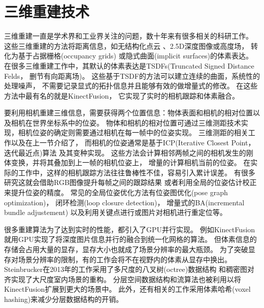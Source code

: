 \section{三维重建技术}\label{reconstruction}
三维重建一直是学术界和工业界关注的问题，数十年来有很多相关的科研工作。
这些三维重建的方法将距离信息，如无结构化点云\cite{henry2010rgb}\cite{keller2013real}
\cite{whelan2015elasticfusion}、2.5D深度图像\cite{meilland2013unifying}或高度场\cite{gallup20103d}，
转化为基于占据栅格(occupancy grids)\cite{elfes1987sensor}
或隐式曲面(implicit surfaces)的体素表达\cite{curless1996volumetric}。
在很多三维重建工作中，其默认的体素表达是TSDFs(Truncated Signed Distance Felds，
删节有向距离场)\cite{fioraio2015large}\cite{fuhrmann2014floating}。
这些基于TSDF的方法可以建立连续的曲面，系统性的处理噪声，
不需要记录显式的拓扑信息并且能够有效的做增量式的修改。
在这些方法中最有名的就是KinectFusion\cite{izadi2011kinectfusion}\cite{newcombe2011kinectfusion}，
它实现了实时的相机跟踪和体素融合。

要利用相机重建三维信息，需要获得两个位置信息：物体表面和相机的相对位置以及相机在世界坐标系中的位姿。
物体和相机的相对位置可通过三维测距技术实现，相机位姿的确定则需要通过相机在每一帧中的位姿实现。
三维测距的相关工作以及在上一节介绍了，
而相机的位姿通常是基于ICP(Iterative Closest Point，迭代最近点)算法
\cite{besl1992method}及其变种实现。
这些方法会计算相邻两帧之间的相机发生的刚体变换，并将其叠加到上一帧的相机位姿上，
增量的计算相机当前的位姿。
在实际的工作中，这样的相机跟踪方法往往鲁棒性不佳，容易引入累计误差。
有很多研究这就会借助RGB图像提升每帧之间的跟踪结果\cite{whelan2013robust}
或者利用全局的位姿估计校正来提升位姿的精度。
常见的全局位姿优化方法有位姿图优化(pose graph optimization)\cite{steinbrucker2013large}，
闭环检测(loop closure detection)\cite{whelan2013deformation}，
增量式的BA(incremental bundle adjustement)\cite{fioraio2015large}
以及利用关键点进行或图片对相机进行重定位等。

很多重建算法为了达到实时的性能，都引入了GPU并行实现。
例如KinectFusion\cite{izadi2011kinectfusion}就用GPU实现了将深度图片信息并行的融合到统一化网格的算法。
但体素信息的存储会占用大量的显存，显存大小也就成了场景分辨率的最大瓶颈。
为了突破显存对场景分辨率的限制，有的工作会将不在视野内的体素从显存中换出\cite{roth2012moving}。
Steinbrucker在2013年的工作\cite{steinbrucker2013large}采用了多尺度的八叉树(octree)数据结构
和稠密图对齐实现了大尺度室内场景的重构。
分层空间数据结构和流算法也被利用以将KinectFusion扩展到更大的场景中\cite{chen2013scalable}。
此外，还有相关的工作\cite{niessner2013real}采用体素哈希(voxel hashing)来减少分层数据结构的开销。 